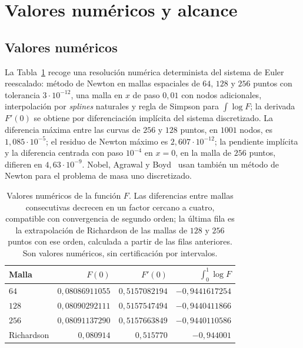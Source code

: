\section{Valores numéricos y alcance}\label{sec:discusion}

\subsection{Valores numéricos}

La Tabla~\ref{tab:numerica} recoge una resolución numérica determinista del sistema de Euler
reescalado: método de Newton en mallas espaciales de $64$, $128$ y $256$ puntos con tolerancia
$3\cdot10^{-12}$, una malla en $x$ de paso $0{,}01$ con nodos adicionales, interpolación por
\emph{splines} naturales y regla de Simpson para $\int\log F$; la derivada $F'(0)$ se obtiene por
diferenciación implícita del sistema discretizado. La diferencia máxima entre las curvas de $256$ y
$128$ puntos, en $1001$ nodos, es $1{,}085\cdot10^{-5}$; el residuo de Newton máximo es
$2{,}607\cdot10^{-12}$; la pendiente implícita y la diferencia centrada con paso $10^{-4}$ en $x=0$,
en la malla de $256$ puntos, difieren en $4{,}63\cdot10^{-9}$. Nobel, Agrawal y Boyd~\cite{NAB}
usan también un método de Newton para el problema de masa uno discretizado.

\begin{table}[ht]
\centering
\begin{tabular}{lrrr}
\toprule
Malla & $F(0)$ & $F'(0)$ & $\int_0^1\log F$\\
\midrule
$64$ & $0{,}08086911055$ & $0{,}5157082194$ & $-0{,}9441617254$\\
$128$ & $0{,}08090292111$ & $0{,}5157547494$ & $-0{,}9440411866$\\
$256$ & $0{,}08091137290$ & $0{,}5157663849$ & $-0{,}9440110586$\\
\midrule
Richardson & $0{,}080914$ & $0{,}515770$ & $-0{,}944001$\\
\bottomrule
\end{tabular}
\caption{Valores numéricos de la función $F$. Las diferencias entre mallas consecutivas decrecen
en un factor cercano a cuatro, compatible con convergencia de segundo orden; la última fila es la
extrapolación de Richardson de las mallas de $128$ y $256$ puntos con ese orden, calculada a partir de
las filas anteriores. Son valores numéricos, sin certificación por intervalos.}
\label{tab:numerica}
\end{table}

